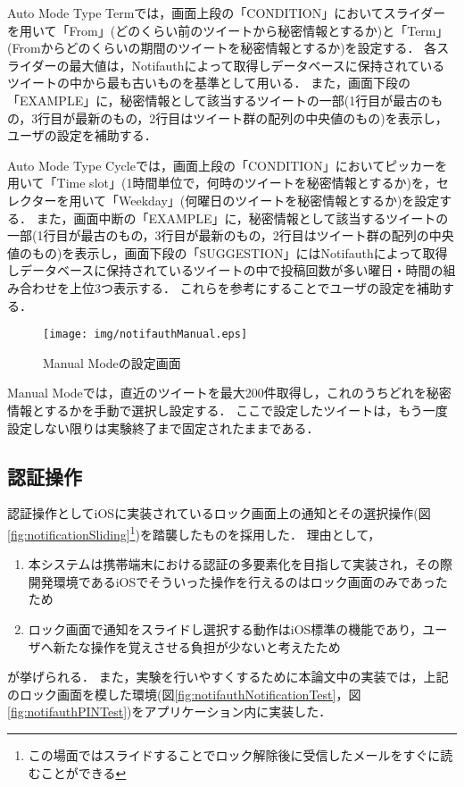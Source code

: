 Auto Mode Type Termでは，画面上段の「CONDITION」においてスライダーを用いて「From」(どのくらい前のツイートから秘密情報とするか)と「Term」(Fromからどのくらいの期間のツイートを秘密情報とするか)を設定する．
各スライダーの最大値は，Notifauthによって取得しデータベースに保持されているツイートの中から最も古いものを基準として用いる．
また，画面下段の「EXAMPLE」に，秘密情報として該当するツイートの一部(1行目が最古のもの，3行目が最新のもの，2行目はツイート群の配列の中央値のもの)を表示し，ユーザの設定を補助する．

Auto Mode Type Cycleでは，画面上段の「CONDITION」においてピッカーを用いて「Time slot」(1時間単位で，何時のツイートを秘密情報とするか)を，セレクターを用いて「Weekday」(何曜日のツイートを秘密情報とするか)を設定する．
また，画面中断の「EXAMPLE」に，秘密情報として該当するツイートの一部(1行目が最古のもの，3行目が最新のもの，2行目はツイート群の配列の中央値のもの)を表示し，画面下段の「SUGGESTION」にはNotifauthによって取得しデータベースに保持されているツイートの中で投稿回数が多い曜日・時間の組み合わせを上位3つ表示する．
これらを参考にすることでユーザの設定を補助する．

\begin{figure}
\begin{center}
\texttt{[image: img/notifauthManual.eps]}
\end{center}
\caption{Manual Modeの設定画面}
\label{fig:notifauthManual}
\end{figure}

Manual Modeでは，直近のツイートを最大200件取得し，これのうちどれを秘密情報とするかを手動で選択し設定する．
ここで設定したツイートは，もう一度設定しない限りは実験終了まで固定されたままである．

\subsection{認証操作}
認証操作としてiOSに実装されているロック画面上の通知とその選択操作(図\ref{fig:notificationSliding}\footnote{この場面ではスライドすることでロック解除後に受信したメールをすぐに読むことができる})を踏襲したものを採用した．
理由として，
\begin{enumerate}
\item 本システムは携帯端末における認証の多要素化を目指して実装され，その際開発環境であるiOSでそういった操作を行えるのはロック画面のみであったため
\item ロック画面で通知をスライドし選択する動作はiOS標準の機能であり，ユーザへ新たな操作を覚えさせる負担が少ないと考えたため
\end{enumerate}
が挙げられる．
また，実験を行いやすくするために本論文中の実装では，上記のロック画面を模した環境(図\ref{fig:notifauthNotificationTest}，図\ref{fig:notifauthPINTest})をアプリケーション内に実装した．

